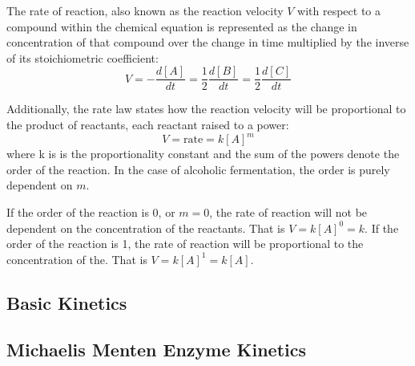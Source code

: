 \documentclass[12pt]{article}
\begin{document}
\medskip

The rate of reaction, also known as the reaction velocity $V$ with respect to a compound within the chemical equation is represented as the change in concentration of that compound over the change in time multiplied by the inverse of its stoichiometric coefficient:
\begin{equation}
    V = -\frac{d[A]}{dt} = \frac{1}{2}\frac{d[B]}{dt} = \frac{1}{2}\frac{d[C]}{dt}
\end{equation}

Additionally, the rate law states how the reaction velocity will be proportional to the product of reactants, each reactant raised to a power:
\begin{equation}
    V = \text{rate} = k[A]^m
\end{equation}
where k is is the proportionality constant \parencite{ref} and the sum of the powers denote the order of the reaction. In the case of alcoholic fermentation, the order is purely dependent on $m$.

\medskip

If the order of the reaction is 0, or $m=0$, the rate of reaction will not be dependent on the concentration of the reactants. That is $V = k[A]^0 = k$. If the order of the reaction is 1, the rate of reaction will be proportional to the concentration of the. That is $V = k[A]^1 = k[A]$.

\subsection{Basic Kinetics}

\subsection{Michaelis Menten Enzyme Kinetics}

\nocite{*}

\newpage

\printbibliography
\end{document}
